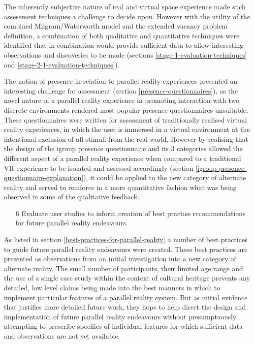 The inherently subjective nature of real and virtual space experience made such assessment techniques a challenge to decide upon. However with the utility of the combined Milgram/Waterworth model and the extended vacancy problem definition, a combination of both qualitative and quantitative techniques were identified that in combination would provide sufficient data to allow interesting observations and discoveries to be made (sections \ref{stage-1-evaluation-techniques} and \ref{stage-2-1-evaluation-techniques}).

The notion of presence in relation to parallel reality experiences presented an interesting challenge for assessment (section \ref{presence-questionnaires}), as the novel nature of a parallel reality experience in promoting interaction with two discrete environments rendered most popular presence questionnaires unsuitable. These questionnaires were written for assessment of traditionally realised virtual reality experiences, in which the user is immersed in a virtual environment at the intentional exclusion of all stimuli from the real world. However by realising that the design of the igroup presence questionnaire and its 3 categories allowed the different aspect of a parallel reality experience when compared to a traditional VR experience to be isolated and assessed accordingly (section \ref{igroup-presence-questionnaire-explanation}), it could be applied to the new category of alternate reality and served to reinforce in a more quantitative fashion what was being observed in some of the qualitative feedback.

\begin{enumerate}
	\item[6] Evaluate user studies to inform creation of best practise recommendations for future parallel reality endeavours.
\end{enumerate}

As listed in section \ref{best-practices-for-parallel-reality} a number of best practices to guide future parallel reality endeavours were created. These best practices are presented as observations from an initial investigation into a new category of alternate reality. The small number of participants, their limited age range and the use of a single case study within the context of cultural heritage prevents any detailed, low level claims being made into the best manners in which to implement particular features of a parallel reality system. But as initial evidence that justifies more detailed future work, they hope to help direct the design and implementation of future parallel reality endeavours without presumptuously attempting to prescribe specifics of individual features for which sufficient data and observations are not yet available.

